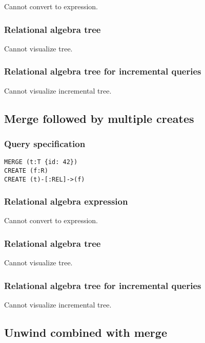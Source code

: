 Cannot convert to expression.

\subsubsection*{Relational algebra tree}

Cannot visualize tree.

\subsubsection*{Relational algebra tree for incremental queries}

Cannot visualize incremental tree.

\subsection{Merge followed by multiple creates}

\subsubsection*{Query specification}

\begin{lstlisting}
MERGE (t:T {id: 42})
CREATE (f:R)
CREATE (t)-[:REL]->(f)
\end{lstlisting}

\subsubsection*{Relational algebra expression}

Cannot convert to expression.

\subsubsection*{Relational algebra tree}

Cannot visualize tree.

\subsubsection*{Relational algebra tree for incremental queries}

Cannot visualize incremental tree.

\subsection{Unwind combined with merge}

